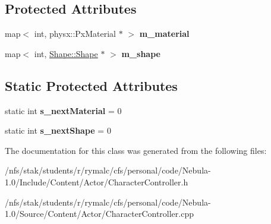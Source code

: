 \subsection*{Protected Attributes}
\begin{DoxyCompactItemize}
\item 
\hypertarget{classContent_1_1CharacterController_a0a0aa5a7645a5078e9ad65b5601d74ec}{
map$<$ int, physx::PxMaterial $\ast$ $>$ {\bfseries m\_\-material}}
\label{classContent_1_1CharacterController_a0a0aa5a7645a5078e9ad65b5601d74ec}

\item 
\hypertarget{classContent_1_1CharacterController_a0d75762f067e4f24a5712bdaaf39fd06}{
map$<$ int, \hyperlink{classContent_1_1Shape_1_1Shape}{Shape::Shape} $\ast$ $>$ {\bfseries m\_\-shape}}
\label{classContent_1_1CharacterController_a0d75762f067e4f24a5712bdaaf39fd06}

\end{DoxyCompactItemize}
\subsection*{Static Protected Attributes}
\begin{DoxyCompactItemize}
\item 
\hypertarget{classContent_1_1CharacterController_a2f2c56186f1df2026d786258fc3e5198}{
static int {\bfseries s\_\-nextMaterial} = 0}
\label{classContent_1_1CharacterController_a2f2c56186f1df2026d786258fc3e5198}

\item 
\hypertarget{classContent_1_1CharacterController_a547bfc6148246b83c1143f8a5908374a}{
static int {\bfseries s\_\-nextShape} = 0}
\label{classContent_1_1CharacterController_a547bfc6148246b83c1143f8a5908374a}

\end{DoxyCompactItemize}


The documentation for this class was generated from the following files:\begin{DoxyCompactItemize}
\item 
/nfs/stak/students/r/rymalc/cfs/personal/code/Nebula-\/1.0/Include/Content/Actor/CharacterController.h\item 
/nfs/stak/students/r/rymalc/cfs/personal/code/Nebula-\/1.0/Source/Content/Actor/CharacterController.cpp\end{DoxyCompactItemize}
